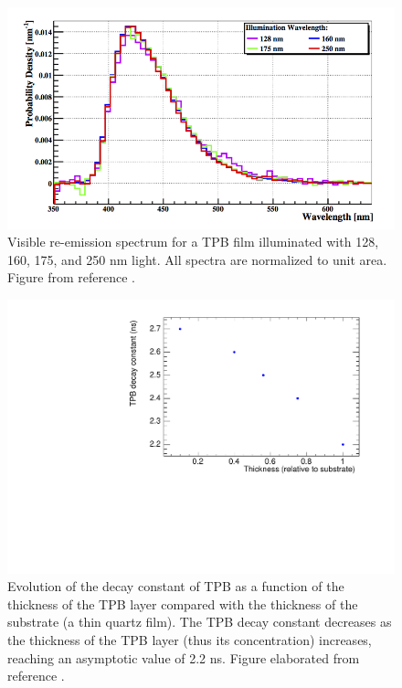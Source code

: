 \documentclass[11pt,a4paper]{article}
\begin{document}
%
\begin{figure}[!htbp]
	\centering
	\includegraphics[scale=0.9]{img/TPBSpectrum.png}
	\caption{Visible re-emission spectrum for a TPB film illuminated with 
	128, 160, 175, and 250 nm light. All spectra are normalized to unit area.
	Figure from reference \cite{Gehman:2011xm}.  }\label{fig.tpb} 
\end{figure}



\begin{figure}[!htbp]
	\centering
	\includegraphics[scale=0.6]{img/TPBdecays.pdf}
	\caption{Evolution of the decay constant of TPB as a function of the thickness of the TPB layer compared
	with the thickness of the substrate (a thin quartz film). The TPB decay constant decreases as the thickness of the TPB layer (thus its concentration) increases, reaching an asymptotic value of 2.2 ns. Figure elaborated from reference \cite{TPBtau}.  }\label{fig.tpbtau} 
\end{figure}
\end{document}
